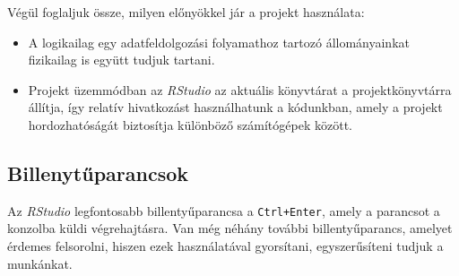 \documentclass[
]{book}
\providecommand{\tightlist}{%
  \setlength{\itemsep}{0pt}\setlength{\parskip}{0pt}}
\begin{document}
Végül foglaljuk össze, milyen előnyökkel jár a projekt használata:

\begin{itemize}
\tightlist
\item
  A logikailag egy adatfeldolgozási folyamathoz tartozó állományainkat fizikailag is együtt tudjuk tartani.
\item
  Projekt üzemmódban az \emph{RStudio} az aktuális könyvtárat a projektkönyvtárra állítja, így relatív hivatkozást használhatunk a kódunkban, amely a projekt hordozhatóságát biztosítja különböző számítógépek között.
\end{itemize}

\hypertarget{billenytux171parancsok}{%
\subsection{Billenytűparancsok}\label{billenytux171parancsok}}

Az \emph{RStudio} legfontosabb billentyűparancsa a \texttt{Ctrl+Enter}, amely a parancsot a konzolba küldi végrehajtásra. Van még néhány további billentyűparancs, amelyet érdemes felsorolni, hiszen ezek használatával gyorsítani, egyszerűsíteni tudjuk a munkánkat.
\end{document}
